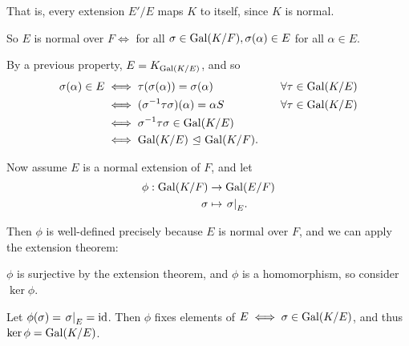 That is, every extension \(E'/E\) maps \(K\) to itself, since \(K\) is
normal.

\begin{center}
\end{center}

So \(E\) is normal over \(F \iff\) for all
\(\sigma \in \mathrm{Gal}(K/F), \sigma(\alpha) \in E\) for all \(\alpha \in E\).

By a previous property, \(E = K_{\mathrm{Gal}(K/E)}\), and so \begin{align*}
\sigma(\alpha) \in E
&\iff \tau(\sigma(\alpha)) = \sigma(\alpha)
&\quad \forall \tau \in \mathrm{Gal}(K/E) \\
&\iff (\sigma^{-1} \tau \sigma) (\alpha) = \alpha
S&\quad \forall \tau \in \mathrm{Gal}(K/E) \\
&\iff \sigma^{-1} \tau\sigma \in \mathrm{Gal}(K/E) \\
&\iff \mathrm{Gal}(K/E) {~\trianglelefteq~} \mathrm{Gal}(K/F)
.\end{align*}

Now assume \(E\) is a normal extension of \(F\), and let \begin{align*}
\phi: \mathrm{Gal}(K/F) &\to \mathrm{Gal}(E/F) \\
\sigma &\mapsto {\left.{\sigma}\right|_{E}}
.\end{align*}

Then \(\phi\) is well-defined precisely because \(E\) is normal over
\(F\), and we can apply the extension theorem:

\begin{center}

\end{center}

\(\phi\) is surjective by the extension theorem, and \(\phi\) is a
homomorphism, so consider \(\ker \phi\).

Let \(\phi(\sigma) = {\left.{\sigma}\right|_{E}} = \text{id}\). Then \(\phi\)
fixes elements of \(E \iff \sigma \in \mathrm{Gal}(K/E)\), and thus
\(\ker \phi = \mathrm{Gal}(K/E)\).

